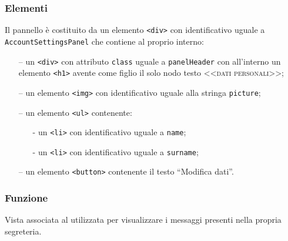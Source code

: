 \subsubsection*{Elementi}
Il pannello è costituito da un elemento \verb'<div>' con identificativo uguale a \verb'AccountSettingsPanel' che contiene al proprio interno:
\begin{itemize}
  \item[--] un \verb'<div>' con attributo \verb'class' uguale a \verb'panelHeader' con all'interno un elemento \verb'<h1>' avente come figlio il solo nodo testo \textsc{<<dati personali>>};
  \item[--] un elemento \verb'<img>' con identificativo uguale alla stringa \verb'picture';
  \item[--] un elemento \verb'<ul>' contenente:
  \begin{itemize}
    \item[-] un \verb'<li>' con identificativo uguale a \verb'name';
    \item[-] un \verb'<li>' con identificativo uguale a \verb'surname';
  \end{itemize}
  \item[--] un elemento \verb'<button>' contenente il testo ``Modifica dati''.
\end{itemize}

\subsubsection*{Funzione}
Vista associata al   utilizzata per visualizzare i messaggi presenti nella propria segreteria.

